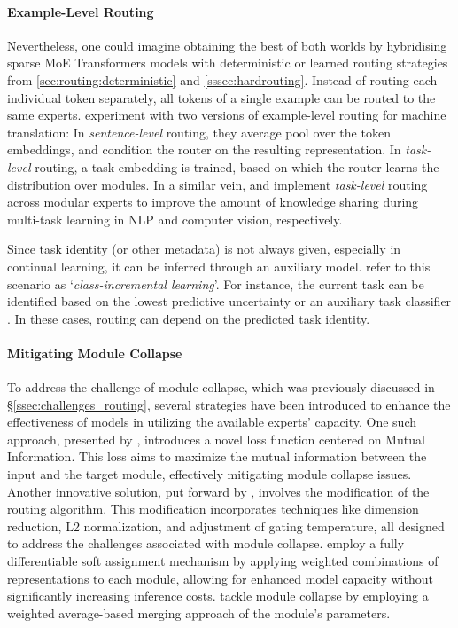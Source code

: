 \documentclass[10pt]{article} %
\begin{document}
\paragraph*{Example-Level Routing}
Nevertheless, one could imagine obtaining the best of both worlds by hybridising sparse MoE Transformers models with deterministic or learned routing strategies from \cref{sec:routing:deterministic} and \cref{sssec:hardrouting}.
Instead of routing each individual token separately, all tokens of a single example can be routed to the same experts. 
\citet{kudugunta2021beyond} experiment with two versions of example-level routing for machine translation: In \textit{sentence-level} routing, they average pool over the token embeddings, and condition the router on the resulting representation. In \textit{task-level} routing, a task embedding is trained, based on which the router learns the distribution over modules. In a similar vein, \citet{Gupta2022Sparsely} and \citet{Xi2022UFO} implement  \textit{task-level} routing across modular experts to improve the amount of knowledge sharing during multi-task learning in NLP and computer vision, respectively. 

Since task identity (or other metadata) is not always given, especially in continual learning, it can be inferred through an auxiliary model.  refer to this scenario as `\textit{class-incremental learning}'. For instance, the current task can be identified based on the lowest predictive uncertainty or an auxiliary task classifier \citep{Oswald2020}. In these cases, routing can depend on the predicted task identity.


\paragraph*{Mitigating Module Collapse}
To address the challenge of module collapse, which was previously discussed in \S \ref{ssec:challenges_routing}, several strategies have been introduced to enhance the effectiveness of models in utilizing the available experts' capacity. One such approach, presented by \citet{shen2023moduleformer}, introduces a novel loss function centered on Mutual Information. This loss aims to maximize the mutual information between the input and the target module, effectively mitigating module collapse issues. Another innovative solution, put forward by \citet{chi2022representation}, involves the modification of the routing algorithm. This modification incorporates techniques like dimension reduction, L2 normalization, and adjustment of gating temperature, all designed to address the challenges associated with module collapse. \citet{puigcerver2023sparse} employ a fully differentiable soft assignment mechanism by applying weighted combinations of representations to each module, allowing for enhanced model capacity without significantly increasing inference costs. \citet{muqeeth2023soft} tackle module collapse by employing a weighted average-based merging approach of the module's parameters.
 
\end{document}
